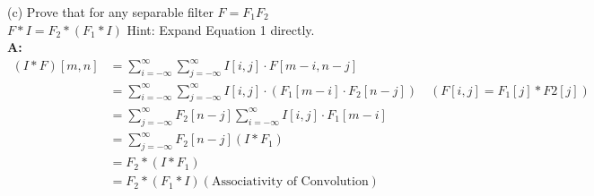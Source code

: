 \documentclass[english,a4paper,12pt]{article}
\begin{document}
\begin{enumerate}
{(c) Prove that for any separable filter $F=F_{1} F_{2}$ \\ 
$F * I=F_{2} *\left(F_{1} * I\right)$
Hint: Expand Equation 1 directly.\\ 
\textbf{A:}  \begin{align*}
(I * F)[m, n] &=\sum_{i=-\infty}^{\infty} \sum_{j=-\infty}^{\infty} I[i, j] \cdot F[m-i, n-j] \\
&=\sum_{i=-\infty}^{\infty} \sum_{j=-\infty}^{\infty} I[i, j] \cdot\left(F_{1}[m-i] \cdot F_{2}[n-j]\right) \quad ( F[i,j]=F_1[j]*F2[j]) \\
&=\sum_{j=-\infty}^{\infty} F_{2}[n-j] \sum_{i=-\infty}^{\infty} I[i, j] \cdot F_{1}[m-i] \\
&=\sum_{j=-\infty}^{\infty} F_{2}[n-j]\left( I * F_{1} \right) \\
&=F_{2} *\left(I * F_{1}\right) \\ 
&= F_{2} *\left( F_{1}*I\right) (\text{Associativity of Convolution})
\end{align*}

}
\end{enumerate}
\end{document}
